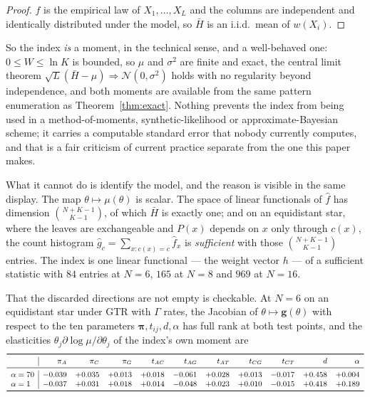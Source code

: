 \documentclass[11pt]{article}
\newcommand{\Hbar}{\bar H}
\newcommand{\bpi}{\boldsymbol{\pi}}
\theoremstyle{definition}
\theoremstyle{remark}
\begin{document}
\begin{proof}
$\hat f$ is the empirical law of $X_1,\dots,X_L$ and the columns are
independent and identically distributed under the model, so $\Hbar$ is an
i.i.d.\ mean of $w(X_i)$.
\end{proof}

So the index \emph{is} a moment, in the technical sense, and a well-behaved
one: $0\le W\le\ln K$ is bounded, so $\mu$ and $\sigma^2$ are finite and
exact, the central limit theorem
$\sqrt L(\Hbar-\mu)\Rightarrow\mathcal N(0,\sigma^2)$ holds with no
regularity beyond independence, and both moments are available from the same
pattern enumeration as Theorem~\ref{thm:exact}. Nothing prevents the index
from being used in a method-of-moments, synthetic-likelihood or
approximate-Bayesian scheme; it carries a computable standard error that
nobody currently computes, and that is a fair criticism of current practice
separate from the one this paper makes.

What it cannot do is identify the model, and the reason is visible in the
same display. The map $\theta\mapsto\mu(\theta)$ is scalar. The space of
linear functionals of $\hat f$ has dimension $\binom{N+K-1}{K-1}$, of which
$\Hbar$ is exactly one; and on an equidistant star, where the leaves are
exchangeable and $P(x)$ depends on $x$ only through $c(x)$, the count
histogram $\hat g_c=\sum_{x:c(x)=c}\hat f_x$ is \emph{sufficient} with those
$\binom{N+K-1}{K-1}$ entries. The index is one linear functional --- the
weight vector $h$ --- of a sufficient statistic with $84$ entries at $N=6$,
$165$ at $N=8$ and $969$ at $N=16$.

That the discarded directions are not empty is checkable. At $N=6$ on an
equidistant star under GTR with $\Gamma$ rates, the Jacobian of
$\theta\mapsto\mathbf g(\theta)$ with respect to the ten parameters
$\bpi,t_{ij},d,\alpha$ has full rank at both test points, and the elasticities
$\theta_j\partial\log\mu/\partial\theta_j$ of the index's own moment are
\begin{equation}
\small
\begin{array}{l|rrrrrrrrrr}
\toprule
 & \pi_A & \pi_C & \pi_G & t_{AC} & t_{AG} & t_{AT} & t_{CG} & t_{CT} & d & \alpha \\
\midrule
\alpha=70 & -0.039 & +0.035 & +0.013 & +0.018 & -0.061 & +0.028 & +0.013 & -0.017 & +0.458 & +0.004 \\
\alpha=1  & -0.037 & +0.031 & +0.018 & +0.014 & -0.048 & +0.023 & +0.010 & -0.015 & +0.418 & +0.189 \\
\bottomrule
\end{array}
\end{equation}
\end{document}
